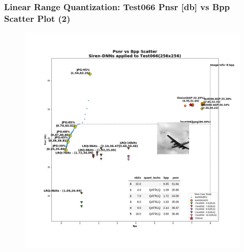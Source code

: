\begin{frame}
    \frametitle{Linear Range Quantization: Test066 Pnsr [db] vs Bpp Scatter Plot (2)}

    \begin{figure}
    \includegraphics[scale=0.22]{slides/experiments/quant_dataset/images/test066_jpeg_quanted_siren_2.png}
    \end{figure}

\end{frame}
